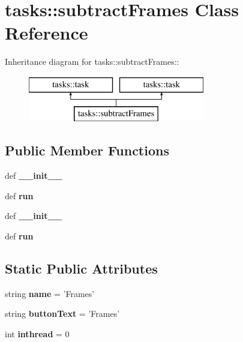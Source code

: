\section{tasks::subtract\-Frames Class Reference}
\label{classtasks_1_1subtractFrames}
Inheritance diagram for tasks::subtract\-Frames::\begin{figure}[H]
\begin{center}
\leavevmode
\includegraphics[height=2cm]{classtasks_1_1subtractFrames}
\end{center}
\end{figure}
\subsection*{Public Member Functions}
\begin{CompactItemize}
\item 
def \textbf{\_\-\_\-init\_\-\_\-}\label{classtasks_1_1subtractFrames_9925214ff2d01c57ef271246f9328c55}

\item 
def \textbf{run}\label{classtasks_1_1subtractFrames_e072c754659b6971f4dd98a90d9170e1}

\item 
def \textbf{\_\-\_\-init\_\-\_\-}\label{classtasks_1_1subtractFrames_9925214ff2d01c57ef271246f9328c55}

\item 
def \textbf{run}\label{classtasks_1_1subtractFrames_e072c754659b6971f4dd98a90d9170e1}

\end{CompactItemize}
\subsection*{Static Public Attributes}
\begin{CompactItemize}
\item 
string \textbf{name} = '{\bfsubtract\-Frames}'\label{classtasks_1_1subtractFrames_2618b923070421fdf3a02526aa2b22b6}

\item 
string \textbf{button\-Text} = '{\bfsubtract\-Frames}'\label{classtasks_1_1subtractFrames_ae4b8667f92f9c37fa53b770f63b2f10}

\item 
int \textbf{inthread} = 0\label{classtasks_1_1subtractFrames_df4128c3c177cd613be440948928fe23}

\end{CompactItemize}


